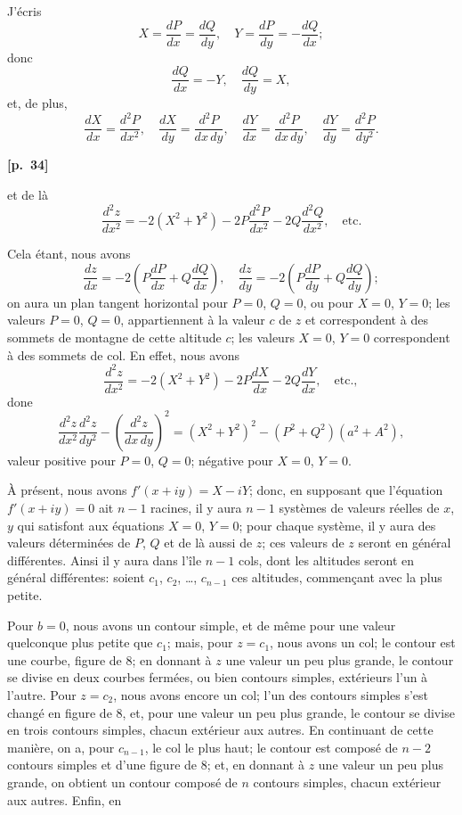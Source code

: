 \documentclass[11pt,a4paper]{article}
\theoremstyle{plain}
\begin{document}
J'\'ecris
$$
X = \frac{dP}{dx} = \frac{dQ}{dy}, \quad Y = \frac{dP}{dy} = -\frac{dQ}{dx};
$$
donc
$$
\frac{dQ}{dx} = -Y, \quad \frac{dQ}{dy} = X,
$$
et, de plus,
$$
\frac{dX}{dx} = \frac{d^2 P}{dx^2}, \quad \frac{dX}{dy} = \frac{d^2 P}{dx\,dy}, \quad \frac{dY}{dx} = \frac{d^2 P}{dx\,dy}, \quad \frac{dY}{dy} = \frac{d^2 P}{dy^2}.
$$

\vspace{0.5em}
\noindent\textbf{[p.\ 34]}

et de l\`a
$$
\frac{d^2 z}{dx^2} = -2(X^2 + Y^2) - 2P\frac{d^2 P}{dx^2} - 2Q\frac{d^2 Q}{dx^2}, \quad \text{etc.}
$$

Cela \'etant, nous avons
$$
\frac{dz}{dx} = -2\left(P\frac{dP}{dx} + Q\frac{dQ}{dx}\right), \quad \frac{dz}{dy} = -2\left(P\frac{dP}{dy} + Q\frac{dQ}{dy}\right);
$$
on aura un plan tangent horizontal pour $P = 0$, $Q = 0$, ou pour $X = 0$, $Y = 0$; les valeurs $P = 0$, $Q = 0$, appartiennent \`a la valeur $c$ de $z$ et correspondent \`a des sommets de montagne de cette altitude $c$; les valeurs $X = 0$, $Y = 0$ correspondent \`a des sommets de col. En effet, nous avons
$$
\frac{d^2 z}{dx^2} = -2(X^2 + Y^2) - 2P\frac{dX}{dx} - 2Q\frac{dY}{dx}, \quad \text{etc.},
$$
done
$$
\frac{d^2 z}{dx^2}\frac{d^2 z}{dy^2} - \left(\frac{d^2 z}{dx\,dy}\right)^2 = (X^2 + Y^2)^2 - (P^2 + Q^2)(a^2 + A^2),
$$
valeur positive pour $P = 0$, $Q = 0$; n\'egative pour $X = 0$, $Y = 0$.

\`A pr\'esent, nous avons $f'(x + iy) = X - iY$; donc, en supposant que l'\'equation $f'(x + iy) = 0$ ait $n - 1$ racines, il y aura $n - 1$ syst\`emes de valeurs r\'eelles de $x$, $y$ qui satisfont aux \'equations $X = 0$, $Y = 0$; pour chaque syst\`eme, il y aura des valeurs d\'etermin\'ees de $P$, $Q$ et de l\`a aussi de $z$; ces valeurs de $z$ seront en g\'en\'eral diff\'erentes. Ainsi il y aura dans l'\^ile $n - 1$ cols, dont les altitudes seront en g\'en\'eral diff\'erentes: soient $c_1$, $c_2$, \ldots, $c_{n-1}$ ces altitudes, commen\c{c}ant avec la plus petite.

Pour $b = 0$, nous avons un contour simple, et de m\^eme pour une valeur quelconque plus petite que $c_1$; mais, pour $z = c_1$, nous avons un col; le contour est une courbe, figure de 8; en donnant \`a $z$ une valeur un peu plus grande, le contour se divise en deux courbes ferm\'ees, ou bien contours simples, ext\'erieurs l'un \`a l'autre. Pour $z = c_2$, nous avons encore un col; l'un des contours simples s'est chang\'e en figure de 8, et, pour une valeur un peu plus grande, le contour se divise en trois contours simples, chacun ext\'erieur aux autres. En continuant de cette mani\`ere, on a, pour $c_{n-1}$, le col le plus haut; le contour est compos\'e de $n - 2$ contours simples et d'une figure de 8; et, en donnant \`a $z$ une valeur un peu plus grande, on obtient un contour compos\'e de $n$ contours simples, chacun ext\'erieur aux autres. Enfin, en
\end{document}
